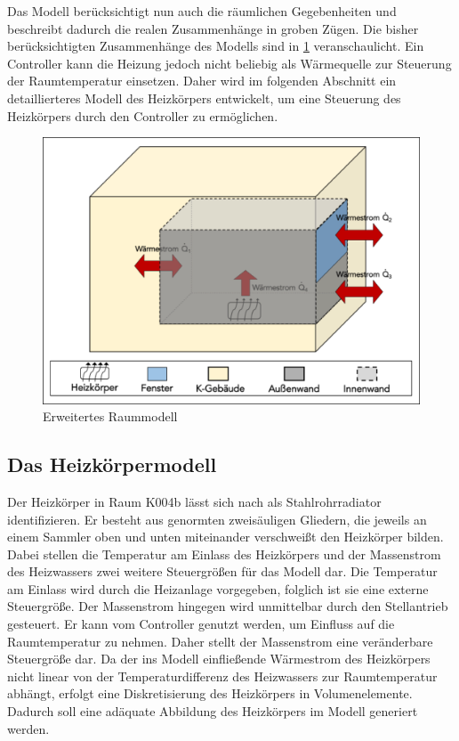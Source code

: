 Das Modell berücksichtigt nun auch die räumlichen Gegebenheiten und beschreibt dadurch die realen Zusammenhänge in groben Zügen. Die bisher berücksichtigten Zusammenhänge des Modells sind in \ref{fig:raumeins} veranschaulicht. Ein Controller kann die Heizung jedoch nicht beliebig als Wärmequelle zur Steuerung der Raumtemperatur einsetzen. Daher wird im folgenden Abschnitt ein detaillierteres Modell des Heizkörpers entwickelt, um eine Steuerung des Heizkörpers durch den Controller zu ermöglichen. 

\begin{figure}
\centering
\includegraphics[width=\textwidth]{abbildungen/20160316_raumeins}
\caption{Erweitertes Raummodell}
\label{fig:raumeins}
\end{figure}



\subsection{Das Heizkörpermodell}

Der Heizkörper in Raum K004b lässt sich nach \cite[S.~824f.]{re14} als Stahlrohrradiator identifizieren. Er besteht aus genormten zweisäuligen Gliedern, die jeweils an einem Sammler oben und unten miteinander verschweißt den Heizkörper bilden. Dabei stellen die Temperatur am Einlass des Heizkörpers und der Massenstrom des Heizwassers zwei weitere Steuergrößen für das Modell dar. Die Temperatur am Einlass wird durch die Heizanlage vorgegeben, folglich ist sie eine externe Steuergröße. Der Massenstrom hingegen wird unmittelbar durch den Stellantrieb gesteuert. Er kann vom Controller genutzt werden, um Einfluss auf die Raumtemperatur zu nehmen. Daher stellt der Massenstrom eine veränderbare Steuergröße dar. Da der ins Modell einfließende Wärmestrom des Heizkörpers nicht linear von der Temperaturdifferenz des Heizwassers zur Raumtemperatur abhängt, erfolgt eine Diskretisierung des Heizkörpers in Volumenelemente. Dadurch soll eine adäquate Abbildung des Heizkörpers im Modell generiert werden. 

